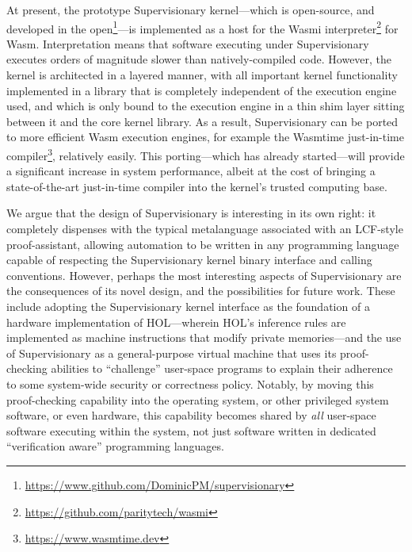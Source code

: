 \documentclass[a4paper, UKenglish, cleveref, autoref, thm-restate, colorlinks]{lipics-v2021}
\begin{document}
At present, the prototype Supervisionary kernel---which is open-source, and developed in the open\footnote{\url{https://www.github.com/DominicPM/supervisionary}}---is implemented as a host for the Wasmi interpreter\footnote{\url{https://github.com/paritytech/wasmi}} for Wasm.
Interpretation means that software executing under Supervisionary executes orders of magnitude slower than natively-compiled code.
However, the kernel is architected in a layered manner, with all important kernel functionality implemented in a library that is completely independent of the execution engine used, and which is only bound to the execution engine in a thin shim layer sitting between it and the core kernel library.
As a result, Supervisionary can be ported to more efficient Wasm execution engines, for example the Wasmtime just-in-time compiler\footnote{\url{https://www.wasmtime.dev}}, relatively easily.
This porting---which has already started---will provide a significant increase in system performance, albeit at the cost of bringing a state-of-the-art just-in-time compiler into the kernel's trusted computing base.

We argue that the design of Supervisionary is interesting in its own right: it completely dispenses with the typical metalanguage associated with an LCF-style proof-assistant, allowing automation to be written in any programming language capable of respecting the Supervisionary kernel binary interface and calling conventions.
However, perhaps the most interesting aspects of Supervisionary are the consequences of its novel design, and the possibilities for future work.
These include adopting the Supervisionary kernel interface as the foundation of a hardware implementation of HOL---wherein HOL's inference rules are implemented as machine instructions that modify private memories---and the use of Supervisionary as a general-purpose virtual machine that uses its proof-checking abilities to ``challenge'' user-space programs to explain their adherence to some system-wide security or correctness policy.
Notably, by moving this proof-checking capability into the operating system, or other privileged system software, or even hardware, this capability becomes shared by \emph{all} user-space software executing within the system, not just software written in dedicated ``verification aware'' programming languages.

\newpage


\end{document}
